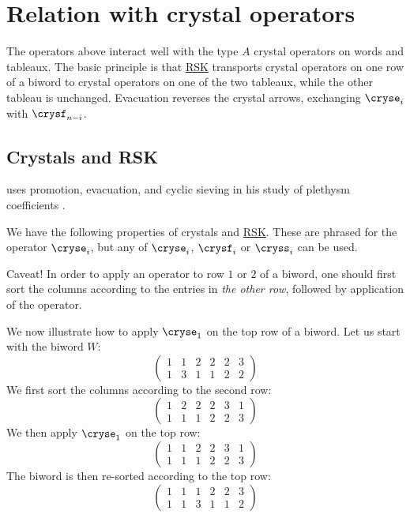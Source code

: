 \section[tableauOpRelations]{Relation with crystal operators}

The operators above interact well with the type $A$ crystal operators on words
and tableaux.  The basic principle is that \hyperref[rsk]{RSK} transports
crystal operators on one row of a biword to crystal operators on one of the two
tableaux, while the other tableau is unchanged.  Evacuation reverses the
crystal arrows, exchanging $\cryse_i$ with $\crysf_{n-i}$.


\subsection[crystalsRSK]{Crystals and RSK}

 uses promotion, evacuation, and cyclic sieving in his study of
plethysm coefficients \cite{Rush2018}.

We have the following properties of crystals and \hyperref[rsk]{RSK}.
These are phrased for the operator $\cryse_i$, but any of $\cryse_i$, $\crysf_i$ or $\cryss_i$
can be used.

Caveat! In order to apply an operator to row $1$ or $2$ of a biword,
one should first sort the columns according to the entries in \emph{the other row},
followed by application of the operator.

\begin{example*}

We now illustrate how to apply $\cryse_1$ on the top row of a biword.
Let us start with the biword $W$:
\[
\begin{pmatrix}
1&1&2&2&2&3 \\
1&3&1&1&2&2
\end{pmatrix}
\]
We first sort the columns according to the second row:
\[
\begin{pmatrix}
1&2&2&2&3&1 \\
1&1&1&2&2&3
\end{pmatrix}
\]
We then apply $\cryse_1$ on the top row:
\[
\begin{pmatrix}
1&1&2&2&3&1 \\
1&1&1&2&2&3
\end{pmatrix}
\]
The biword is then re-sorted according to the top row:
\[
\begin{pmatrix}
1&1&1&2&2&3 \\
1&1&3&1&1&2
\end{pmatrix}
\]
\end{example*}


